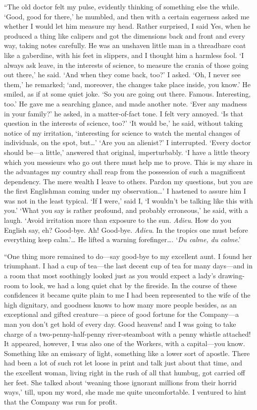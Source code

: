 \documentclass[12pt]{report}
\begin{document}
``The old doctor felt my pulse, evidently thinking of something else the
while. `Good, good for there,' he mumbled, and then with a certain
eagerness asked me whether I would let him measure my head. Rather
surprised, I said Yes, when he produced a thing like calipers and got
the dimensions back and front and every way, taking notes carefully. He
was an unshaven little man in a threadbare coat like a gaberdine, with
his feet in slippers, and I thought him a harmless fool. `I always ask
leave, in the interests of science, to measure the crania of those going
out there,' he said. `And when they come back, too?' I asked. `Oh, I
never see them,' he remarked; `and, moreover, the changes take place
inside, you know.' He smiled, as if at some quiet joke. `So you are
going out there. Famous. Interesting, too.' He gave me a searching
glance, and made another note. `Ever any madness in your family?' he
asked, in a matter-of-fact tone. I felt very annoyed. `Is that question
in the interests of science, too?' `It would be,' he said, without
taking notice of my irritation, `interesting for science to watch the
mental changes of individuals, on the spot, but\ldots{}' `Are you an
alienist?' I interrupted. `Every doctor should be---a little,' answered
that original, imperturbably. `I have a little theory which you
messieurs who go out there must help me to prove. This is my share in
the advantages my country shall reap from the possession of such a
magnificent dependency. The mere wealth I leave to others. Pardon my
questions, but you are the first Englishman coming under my
observation\ldots{}' I hastened to assure him I was not in the least
typical. `If I were,' said I, `I wouldn't be talking like this with
you.' `What you say is rather profound, and probably erroneous,' he
said, with a laugh. `Avoid irritation more than exposure to the sun.
\emph{Adieu}. How do you English say, eh? Good-bye. Ah! Good-bye.
\emph{Adieu}. In the tropics one must before everything keep
calm.'\ldots{} He lifted a warning forefinger\ldots{}. `\emph{Du calme,
du calme}.'

``One thing more remained to do---say good-bye to my excellent aunt. I
found her triumphant. I had a cup of tea---the last decent cup of tea
for many days---and in a room that most soothingly looked just as you
would expect a lady's drawing-room to look, we had a long quiet chat by
the fireside. In the course of these confidences it became quite plain
to me I had been represented to the wife of the high dignitary, and
goodness knows to how many more people besides, as an exceptional and
gifted creature---a piece of good fortune for the Company---a man you
don't get hold of every day. Good heavens! and I was going to take
charge of a two-penny-half-penny river-steamboat with a penny whistle
attached! It appeared, however, I was also one of the Workers, with a
capital---you know. Something like an emissary of light, something like
a lower sort of apostle. There had been a lot of such rot let loose in
print and talk just about that time, and the excellent woman, living
right in the rush of all that humbug, got carried off her feet. She
talked about `weaning those ignorant millions from their horrid ways,'
till, upon my word, she made me quite uncomfortable. I ventured to hint
that the Company was run for profit.
\end{document}
